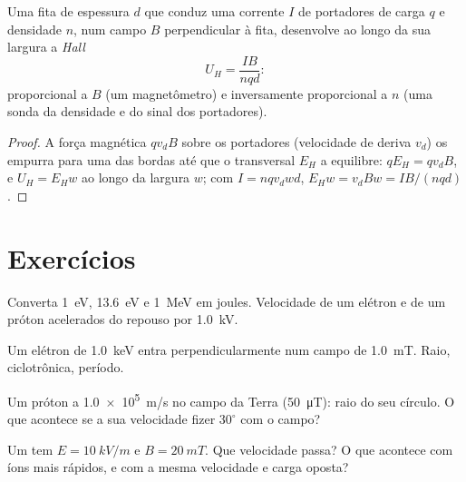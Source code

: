\begin{proposition}\label{prop:b1:charged-particles:hall}
Uma fita de espessura $d$ que conduz uma corrente $I$ de portadores de carga
$q$ e densidade $n$, num campo $B$ perpendicular à fita,
desenvolve ao longo da sua largura a \emph{ Hall}
\[
U_H = \frac{IB}{nqd} :
\]
proporcional a $B$ (um magnetômetro) e inversamente proporcional a $n$ (uma sonda da
densidade e do sinal dos portadores).
\end{proposition}

\begin{proof}
A força magnética $qv_dB$ sobre os portadores (velocidade de deriva $v_d$) os empurra
para uma das bordas até que o  transversal $E_H$ a equilibre:
$qE_H = qv_dB$, e $U_H = E_Hw$ ao longo da largura $w$; com $I = nqv_dwd$,
$E_Hw = v_dBw = IB/(nqd)$.
\end{proof}

\section{Exercícios}

\begin{exercise}[$\star$]\label{exo:b1:charged-particles:1}
Converta \qty{1}{eV}, \qty{13.6}{eV} e \qty{1}{MeV} em joules. Velocidade de um
elétron e de um próton acelerados do repouso por \qty{1.0}{kV}.
\end{exercise}

\begin{exercise}[$\star$]\label{exo:b1:charged-particles:2}
Um elétron de \qty{1.0}{keV} entra perpendicularmente num campo de \qty{1.0}{mT}.
Raio,  ciclotrônica, período.
\end{exercise}

\begin{exercise}[$\star$]\label{exo:b1:charged-particles:3}
Um próton a \qty{1.0e5}{m/s} no campo da Terra (\qty{50}{\micro T}):
raio do seu círculo. O que acontece se a sua velocidade fizer $30^\circ$ com
o campo?
\end{exercise}

\begin{exercise}[$\star$]\label{exo:b1:charged-particles:4}
Um  tem $E = \qty{10}{kV/m}$ e $B = \qty{20}{mT}$. Que
velocidade passa? O que acontece com íons mais rápidos, e com a mesma velocidade e
carga oposta?
\end{exercise}

